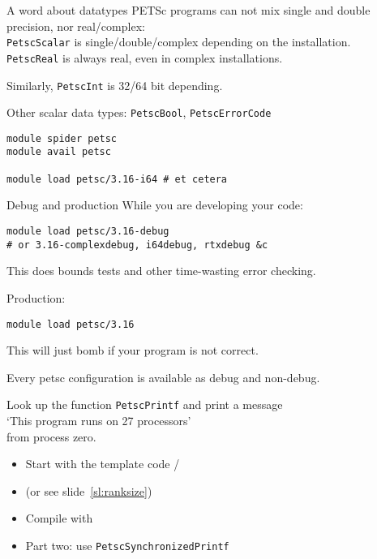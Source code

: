 \lstset{language=C}

\begin{numberedframe}{A word about datatypes}
PETSc programs can not mix single and double precision, nor real/complex:\\
\lstinline{PetscScalar} is single/double/complex depending on the installation.\\
\lstinline{PetscReal} is always real, even in complex installations.

Similarly, \lstinline{PetscInt} is 32/64 bit depending.

Other scalar data types: \lstinline{PetscBool}, \lstinline{PetscErrorCode}

\begin{taccnote}
\begin{verbatim}
module spider petsc
module avail petsc

module load petsc/3.16-i64 # et cetera
\end{verbatim}
\end{taccnote}

\end{numberedframe}

\begin{numberedframe}{Debug and production}
While you are developing your code:
\begin{verbatim}
module load petsc/3.16-debug
# or 3.16-complexdebug, i64debug, rtxdebug &c
\end{verbatim}
This does bounds tests and other time-wasting error checking.

Production:
\begin{verbatim}
module load petsc/3.16
\end{verbatim}
This will just bomb if your program is not correct.

Every petsc configuration is available as debug and non-debug.
\end{numberedframe}

\begin{exerciseframe}[hello]
Look up the function \lstinline{PetscPrintf} and print a message\\
`This program runs on 27 processors'\\
from process zero.

\begin{itemize}
\item Start with the template code /
\item (or see slide~\ref{sl:ranksize})
\item Compile with 
\item Part two: use \lstinline{PetscSynchronizedPrintf}
\end{itemize}
\end{exerciseframe}

